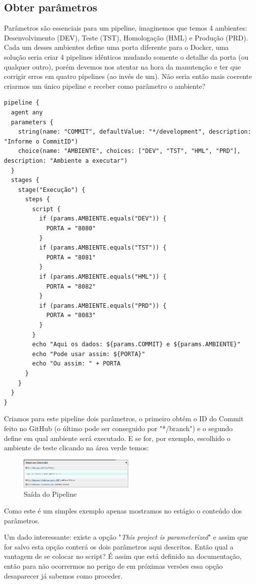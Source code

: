 \documentclass[a4paper,11pt]{article}
\begin{document}
\subsection{Obter parâmetros}
Parâmetros são essenciais para um pipeline, imaginemos que temos 4 ambientes: Desenvolvimento (DEV), Teste (TST), Homologação (HML) e Produção (PRD). Cada um desses ambientes define uma porta diferente para o Docker, uma solução seria criar 4 pipelines idênticos mudando somente o detalhe da porta (ou qualquer outro), porém devemos nos atentar na hora da manutenção e ter que corrigir erros em quatro pipelines (ao invés de um). Não seria então mais coerente criarmos um único pipeline e receber como parâmetro o ambiente?
\begin{lstlisting}
pipeline {
  agent any
  parameters {
    string(name: "COMMIT", defaultValue: "*/development", description: "Informe o CommitID")
    choice(name: "AMBIENTE", choices: ["DEV", "TST", "HML", "PRD"], description: "Ambiente a executar")
  }
  stages {
    stage("Execução") {
      steps {
        script {
          if (params.AMBIENTE.equals("DEV")) {
            PORTA = "8080"
          }  
          if (params.AMBIENTE.equals("TST")) {
            PORTA = "8081"
          }  
          if (params.AMBIENTE.equals("HML")) {
            PORTA = "8082"
          }  
          if (params.AMBIENTE.equals("PRD")) {
            PORTA = "8083"
          }
        }
        echo "Aqui os dados: ${params.COMMIT} e ${params.AMBIENTE}"
        echo "Pode usar assim: ${PORTA}"
        echo "Ou assim: " + PORTA
      }
    }
  }
}
\end{lstlisting}

Criamos para este pipeline dois parâmetros, o primeiro obtém o ID do Commit feito no GitHub (o último pode ser conseguido por "*/branch") e o segundo define em qual ambiente será executado. E se for, por exemplo, escolhido o ambiente de teste clicando na área verde temos:
\begin{figure}[H]
	\centering
	\includegraphics[width=0.5\textwidth]{imagens/parametro.png}
	\caption{Saída do Pipeline}
\end{figure}

Como este é um simples exemplo apenas mostramos no estágio o conteúdo dos parâmetros.

Um dado interessante: existe a opção "\textit{This project is parameterized}" e assim que for salvo esta opção conterá os dois parâmetros aqui descritos. Então qual a vantagem de se colocar no script? É assim que está definido na documentação, então para não ocorrermos no perigo de em próximas versões essa opção desaparecer já sabemos como proceder.
\end{document}
